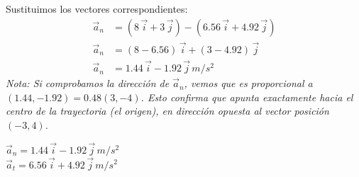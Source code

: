 \documentclass[12pt, a4paper]{article}
\begin{document}
Sustituimos los vectores correspondientes:
\begin{align*}
    \vec{a}_n &= (8 \, \vec{i} + 3 \, \vec{j}) - (6.56 \, \vec{i} + 4.92 \, \vec{j}) \\
    \vec{a}_n &= (8 - 6.56) \, \vec{i} + (3 - 4.92) \, \vec{j} \\
    \vec{a}_n &= 1.44 \, \vec{i} - 1.92 \, \vec{j} \, \si{m/s^2}
\end{align*}
\textit{Nota: Si comprobamos la dirección de $\vec{a}_n$, vemos que es proporcional a $(1.44, -1.92) = 0.48(3, -4)$. Esto confirma que apunta exactamente hacia el centro de la trayectoria (el origen), en dirección opuesta al vector posición $(-3, 4)$.}

\begin{tcolorbox}[colback=green!5!white, colframe=green!50!black, title=Respuesta Final]
\centering 
$\vec{a}_n = 1.44 \, \vec{i} - 1.92 \, \vec{j} \, \si{m/s^2}$ \\
\vspace{0.2cm}
$\vec{a}_t = 6.56 \, \vec{i} + 4.92 \, \vec{j} \, \si{m/s^2}$
\end{tcolorbox}
\end{document}
